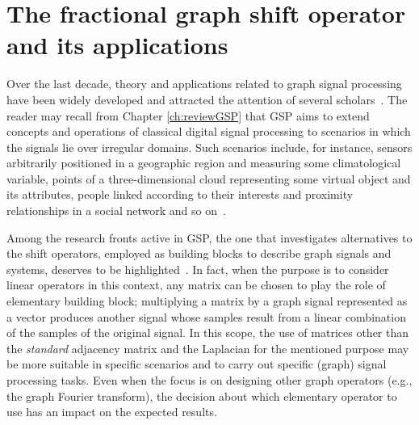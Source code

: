 \chapter{The fractional graph shift operator and its applications}
\label{ch:FrGSO}

Over the last decade, theory and applications related to graph signal processing have been widely developed and attracted the attention of several scholars~\cite{ortega2018,richard2018,ribeiro2018}. The reader may recall from Chapter \ref{ch:reviewGSP} that GSP aims to extend concepts and operations of classical digital signal processing to scenarios in which the signals lie over irregular domains. Such scenarios include, for instance, sensors arbitrarily positioned in a geographic region and measuring some climatological variable, points of a three-dimensional cloud representing some virtual object and its attributes, people linked according to their interests and proximity relationships in a social network and so on~\cite{chen2014,zhang2014,benzi2016,weiyu2018,saad2018,jiang2021,gama2019,liu2019,zhang2020,ferreira2020,zhang2021,xiao2021,sun2021}.

Among the research fronts active in GSP, the one that investigates alternatives to the shift operators, employed as building blocks to describe graph signals and systems, deserves to be highlighted~\cite{girault2015translation,gavili2017,fan20191,fan2019,mollaebrahim2021,shafipour2018,shafipour2019}. {In fact, when the purpose is to consider linear operators in this context, any matrix can be chosen to play the role of elementary building block; multiplying a matrix by a graph signal represented as a vector produces another signal whose samples result from a linear combination of the samples of the original signal. In this scope,} the use of matrices other than the \textit{standard} adjacency matrix and the Laplacian for the mentioned purpose may {be more suitable in specific scenarios and to carry out specific (graph) signal processing tasks. Even when the focus is on designing other graph operators (e.g., the graph Fourier transform), the decision about which elementary operator to use has an impact on the expected results.}

